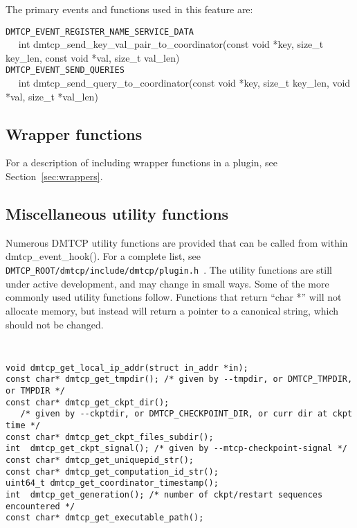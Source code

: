 \documentclass{article}
\begin{document}
The primary events and functions used in this feature are:

\noindent
{\tt DMTCP\_EVENT\_REGISTER\_NAME\_SERVICE\_DATA} \\
\hbox{\ \ }
int dmtcp\_send\_key\_val\_pair\_to\_coordinator(const void *key,
                                                   size\_t key\_len,
                                                   const void *val,
                                                   size\_t val\_len) \\
{\tt DMTCP\_EVENT\_SEND\_QUERIES} \\
\hbox{\ \ }
int dmtcp\_send\_query\_to\_coordinator(const void *key, size\_t key\_len,
                                            void *val, size\_t *val\_len)

\subsection{Wrapper functions}

For a description of including wrapper functions in a plugin, see
Section~\ref{sec:wrappers}.

\subsection{Miscellaneous utility functions}

Numerous DMTCP utility functions are provided that can be called from within
dmtcp\_event\_hook().  For a complete list, see
{\tt DMTCP\_ROOT/dmtcp/include/dmtcp/plugin.h}~.
The utility functions are still under active development, and may change
in small ways.  Some of the more commonly used utility functions follow.
Functions that return ``char *'' will not allocate memory, but instead will
return a pointer to a canonical string, which should not be changed.
{\tt
\begin{verbatim}
void dmtcp_get_local_ip_addr(struct in_addr *in);
const char* dmtcp_get_tmpdir(); /* given by --tmpdir, or DMTCP_TMPDIR, or TMPDIR */
const char* dmtcp_get_ckpt_dir();
   /* given by --ckptdir, or DMTCP_CHECKPOINT_DIR, or curr dir at ckpt time */
const char* dmtcp_get_ckpt_files_subdir();
int  dmtcp_get_ckpt_signal(); /* given by --mtcp-checkpoint-signal */
const char* dmtcp_get_uniquepid_str();
const char* dmtcp_get_computation_id_str();
uint64_t dmtcp_get_coordinator_timestamp();
int  dmtcp_get_generation(); /* number of ckpt/restart sequences encountered */
const char* dmtcp_get_executable_path();
\end{verbatim}
}
\end{document}
